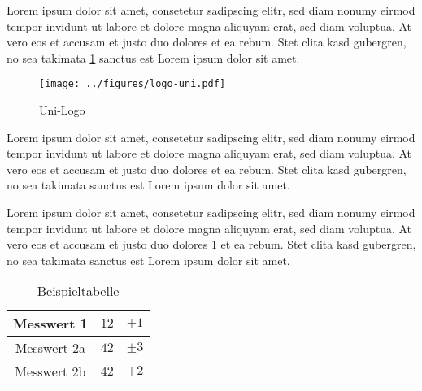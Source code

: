 \documentclass[12pt]{scrartcl}
\begin{document}
\setcounter{exnum}{20}
Lorem ipsum dolor sit amet, consetetur sadipscing elitr, sed diam nonumy eirmod tempor invidunt ut labore et dolore magna aliquyam erat, sed diam voluptua. At vero eos et accusam et justo duo dolores et ea rebum. Stet clita kasd gubergren, no sea takimata \ref{fig:logo-uni} sanctus est Lorem ipsum dolor sit amet.

\begin{figure}[!h]
	\centering
		\texttt{[image: ../figures/logo-uni.pdf]}
	\caption{Uni-Logo}
	\label{fig:logo-uni}
\end{figure}
Lorem ipsum dolor sit amet, consetetur sadipscing elitr, sed diam nonumy eirmod tempor invidunt ut labore et dolore magna aliquyam erat, sed diam voluptua. At vero eos et accusam et justo duo dolores et ea rebum. Stet clita kasd gubergren, no sea takimata sanctus est Lorem ipsum dolor sit amet.

Lorem ipsum dolor sit amet, consetetur sadipscing elitr, sed diam nonumy eirmod tempor invidunt ut labore et dolore magna aliquyam erat, sed diam voluptua. At vero eos et accusam et justo duo dolores \ref{tab:tabelle} et ea rebum. Stet clita kasd gubergren, no sea takimata sanctus est Lorem ipsum dolor sit amet.
\begin{table}[!h]	
	\centering
  \begin{tabular}{c|r l}	 
    Messwert 1 & $12$ & $\pm 1$ \\   \hline	 
    Messwert 2a & $42$ & $\pm 3$ \\	 
    Messwert 2b & $42$ & $\pm 2$ 	
  \end{tabular}	
  \caption{Beispieltabelle}	
  \label{tab:tabelle}
\end{table}


\end{document}
